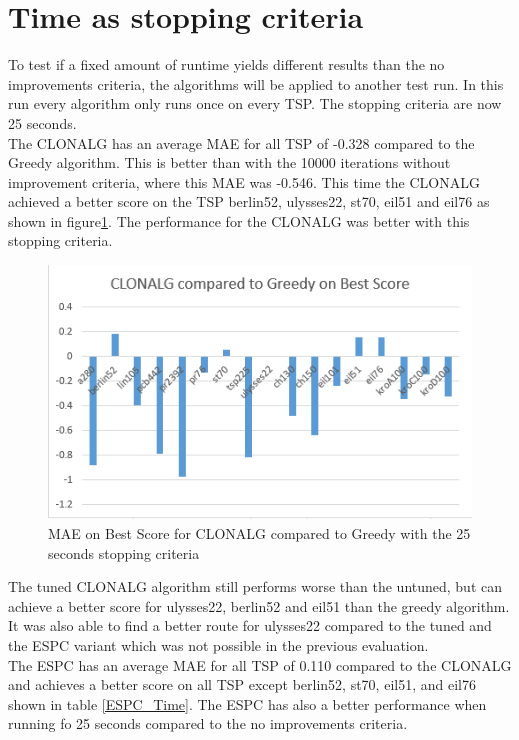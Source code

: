 \section{Time as stopping criteria}
To test if a fixed amount of runtime yields different results than the no improvements criteria, the algorithms will be applied to another test run. In this run every algorithm only runs once on every TSP. The stopping criteria are now 25 seconds.\\
The CLONALG has an average MAE for all TSP of -0.328 compared to the Greedy algorithm. This is better than with the 10000 iterations without improvement criteria, where this MAE was -0.546. This time the CLONALG achieved a better score on the TSP berlin52, ulysses22, st70, eil51 and eil76 as shown in figure\ref{CLONALG_Time}. The performance for the CLONALG was better with this stopping criteria.
\begin{figure}[H]
	\includegraphics[]{Images/CLONALG_Time.png}
	\caption{MAE on Best Score for CLONALG compared to Greedy with the 25 seconds stopping criteria}
	\label{CLONALG_Time}
\end{figure}
The tuned CLONALG algorithm still performs worse than the untuned, but can achieve a better score for ulysses22, berlin52 and eil51 than the greedy algorithm. It was also able to find a better route for ulysses22 compared to the tuned and the ESPC variant which was not possible in the previous evaluation.\\
The ESPC has an average MAE for all TSP of 0.110 compared to the CLONALG and achieves a better score on all TSP except berlin52, st70, eil51, and eil76 shown in table \ref{ESPC_Time}. The ESPC has also a better performance when running fo 25 seconds compared to the no improvements criteria.
